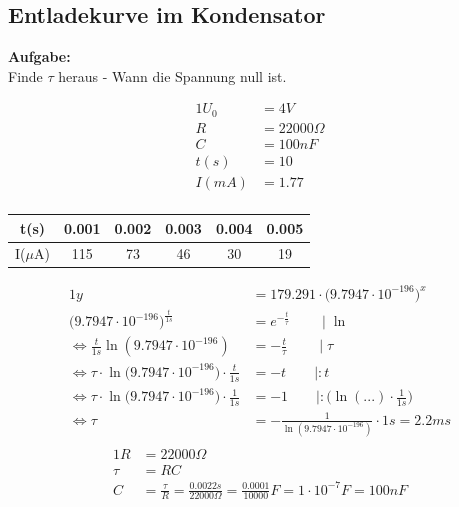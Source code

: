 \documentclass{article}
\begin{document}
	\subsection{Entladekurve im Kondensator}
	\textbf{Aufgabe:}\\
	Finde $\tau$ heraus - Wann die Spannung null ist.\\
	\begin{minipage}[t]{0.28\textwidth}
		\begin{alignat}{1}
			U_0 &= 4V\\
			R &= 22000 \Omega \\
			C &= 100nF\\
			t(s) &= 10\\
			I (mA) &= 1.77\\
		\end{alignat}
	\end{minipage}
	\hfill
	\begin{minipage}[htbp]{0.68\textwidth}
		\begin{tabular}{|c|c|c|c|c|c|}
			\hline t(s) & 0.001 & 0.002 & 0.003 & 0.004 & 0.005\\
			\hline I($\mu$A) & 115 & 73 & 46 & 30 & 19\\
			\hline
		\end{tabular}
	\end{minipage}
	\begin{alignat}{1}
		y&= 179.291 \cdot \Big(9.7947 \cdot 10^{-196}\Big)^x\\
		\Big(9.7947 \cdot 10^{-196}\Big)^{\frac{t}{1s}} &= e^{- \frac{t}{\tau}} \qquad \mid \ln\\
		\Leftrightarrow \frac{t}{1s} \ln (9.7947 \cdot 10^{-196}) &= - \frac{t}{\tau} \qquad \mid \tau\\
		\Leftrightarrow \tau \cdot \ln \Big(9.7947 \cdot 10^{-196}\Big) \cdot \frac{t}{1s} &= -t \qquad \mid : t\\
		\Leftrightarrow \tau \cdot \ln \Big(9.7947 \cdot 10^{-196}\Big) \cdot \frac{1}{1s} &= -1 \qquad \mid : \Big( \ln(...)\cdot \frac{1}{1s} \Big)\\
		\Leftrightarrow \tau &= - \frac{1}{\ln (9.7947 \cdot 10^{-196})}	 \cdot 1s = 2.2ms\\
	\end{alignat}
	\begin{alignat}{1}
		R &= 22000 \Omega\\
		\tau &= RC\\
		C &= \frac{\tau}{R} = \frac{0.0022s}{22000\Omega} = \frac{0.0001}{10000} F = 1 \cdot 10^{-7} F = 100nF\\
	\end{alignat}
	
\end{document}
